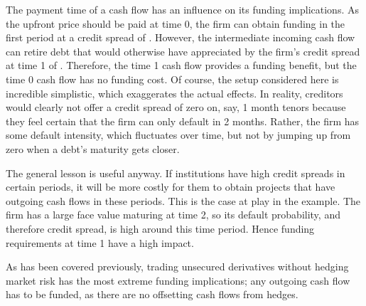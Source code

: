 \documentclass[main.tex]{subfiles}
\begin{document}
        The payment time of a cash flow has an influence on its funding implications.
        As the upfront price should be paid at time 0, 
        the firm can obtain funding in the first period at a credit spread of .
        However, the intermediate incoming cash flow can retire debt
        that would otherwise have appreciated 
        by the firm's credit spread at time 1 of .
        Therefore, the time 1 cash flow provides a funding benefit,
        but the time 0 cash flow has no funding cost.
        Of course, the setup considered here is incredible simplistic,
        which exaggerates the actual effects.
        In reality, creditors would clearly not offer a credit spread of zero on, say,
        1 month tenors because they feel certain that the firm can only default in 2 months.
        Rather, the firm has some default intensity, which fluctuates over time,
        but not by jumping up from zero when a debt's maturity gets closer.

        The general lesson is useful anyway.
        If institutions have high credit spreads in certain periods,
        it will be more costly for them to obtain projects 
        that have outgoing cash flows in these periods.
        This is the case at play in the example.
        The firm has a large face value maturing at time 2, 
        so its default probability, and therefore credit spread,
        is high around this time period.
        Hence funding requirements at time 1 have a high impact.

        As has been covered previously, trading unsecured derivatives without hedging market risk
        has the most extreme funding implications;
        any outgoing cash flow has to be funded, 
        as there are no offsetting cash flows from hedges.
\end{document}

